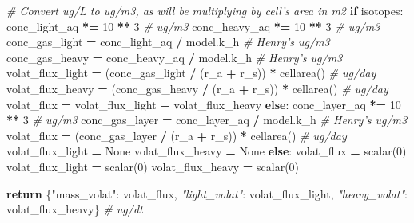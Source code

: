 \documentclass[]{article}
\newenvironment{Shaded}{\begin{snugshade}}{\end{snugshade}}
\newcommand{\DecValTok}[1]{\textcolor[rgb]{0.00,0.00,0.81}{{#1}}}
\newcommand{\StringTok}[1]{\textcolor[rgb]{0.31,0.60,0.02}{{#1}}}
\newcommand{\CommentTok}[1]{\textcolor[rgb]{0.56,0.35,0.01}{\textit{{#1}}}}
\newcommand{\VariableTok}[1]{\textcolor[rgb]{0.00,0.00,0.00}{{#1}}}
\newcommand{\ControlFlowTok}[1]{\textcolor[rgb]{0.13,0.29,0.53}{\textbf{{#1}}}}
\newcommand{\OperatorTok}[1]{\textcolor[rgb]{0.81,0.36,0.00}{\textbf{{#1}}}}
\newcommand{\NormalTok}[1]{{#1}}
\begin{document}
\begin{Shaded}
\begin{Highlighting}[]
        \CommentTok{# Convert ug/L to ug/m3, as will be multiplying by cell's area in m2}
        \ControlFlowTok{if} \NormalTok{isotopes:}
            \NormalTok{conc_light_aq }\OperatorTok{*=} \DecValTok{10} \OperatorTok{**} \DecValTok{3}  \CommentTok{# ug/m3}
            \NormalTok{conc_heavy_aq }\OperatorTok{*=} \DecValTok{10} \OperatorTok{**} \DecValTok{3}  \CommentTok{# ug/m3}
            \NormalTok{conc_gas_light }\OperatorTok{=} \NormalTok{conc_light_aq }\OperatorTok{/} \NormalTok{model.k_h  }\CommentTok{# Henry's  ug/m3}
            \NormalTok{conc_gas_heavy }\OperatorTok{=} \NormalTok{conc_heavy_aq }\OperatorTok{/} \NormalTok{model.k_h  }\CommentTok{# Henry's  ug/m3}
            \NormalTok{volat_flux_light }\OperatorTok{=} \NormalTok{(conc_gas_light }\OperatorTok{/} \NormalTok{(r_a }\OperatorTok{+} \NormalTok{r_s)) }\OperatorTok{*} \NormalTok{cellarea()  }\CommentTok{# ug/day}
            \NormalTok{volat_flux_heavy }\OperatorTok{=} \NormalTok{(conc_gas_heavy }\OperatorTok{/} \NormalTok{(r_a }\OperatorTok{+} \NormalTok{r_s)) }\OperatorTok{*} \NormalTok{cellarea()  }\CommentTok{# ug/day}
            \NormalTok{volat_flux }\OperatorTok{=} \NormalTok{volat_flux_light }\OperatorTok{+} \NormalTok{volat_flux_heavy}
        \ControlFlowTok{else}\NormalTok{:}
            \NormalTok{conc_layer_aq }\OperatorTok{*=} \DecValTok{10} \OperatorTok{**} \DecValTok{3}  \CommentTok{# ug/m3}
            \NormalTok{conc_gas_layer }\OperatorTok{=} \NormalTok{conc_layer_aq }\OperatorTok{/} \NormalTok{model.k_h  }\CommentTok{# Henry's  ug/m3}
            \NormalTok{volat_flux }\OperatorTok{=} \NormalTok{(conc_gas_layer }\OperatorTok{/} \NormalTok{(r_a }\OperatorTok{+} \NormalTok{r_s)) }\OperatorTok{*} \NormalTok{cellarea()  }\CommentTok{# ug/day}
            \NormalTok{volat_flux_light }\OperatorTok{=} \VariableTok{None}
            \NormalTok{volat_flux_heavy }\OperatorTok{=} \VariableTok{None}
    \ControlFlowTok{else}\NormalTok{:}
        \NormalTok{volat_flux }\OperatorTok{=} \NormalTok{scalar(}\DecValTok{0}\NormalTok{)}
        \NormalTok{volat_flux_light }\OperatorTok{=} \NormalTok{scalar(}\DecValTok{0}\NormalTok{)}
        \NormalTok{volat_flux_heavy }\OperatorTok{=} \NormalTok{scalar(}\DecValTok{0}\NormalTok{)}
        
    \ControlFlowTok{return} \NormalTok{\{}\StringTok{"mass_volat"}\NormalTok{: volat_flux,}
            \CommentTok{"light_volat"}\NormalTok{: volat_flux_light,}
            \CommentTok{"heavy_volat"}\NormalTok{: volat_flux_heavy\}  }\CommentTok{# ug/dt}
\end{Highlighting}
\end{Shaded}


\end{document}
